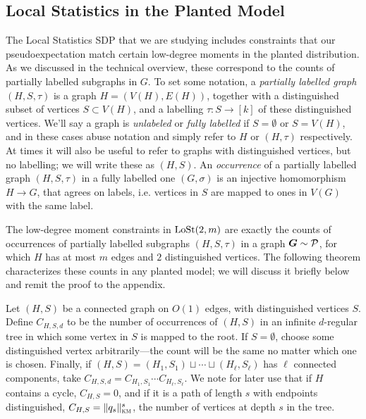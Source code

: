 \subsection{Local Statistics in the Planted Model} %
\label{sub:local_statistics_in_the_planted_model}

The Local Statistics SDP that we are studying includes constraints that our pseudoexpectation match certain low-degree moments in the planted distribution. As we discussed in the technical overview, these correspond to the counts of partially labelled subgraphs in $G$. To set some notation, a \textit{partially labelled graph} $(H,S,\tau)$ is a graph $H = (V(H),E(H))$, together with a distinguished subset of vertices $S \subset V(H)$, and a labelling $\tau : S \to [k]$ of these distinguished vertices. We'll say a graph is \emph{unlabeled} or \textit{fully labelled} if $S = \emptyset$ or $S = V(H)$, and in these cases abuse notation and simply refer to $H$ or $(H,\tau)$ respectively. At times it will also be useful to refer to graphs with distinguished vertices, but no labelling; we will write these as $(H,S)$. An \textit{occurrence} of a partially labelled graph $(H,S,\tau)$ in a fully labelled one $(G,\sigma)$ is an injective homomorphism $H \to G$, that agrees on labels, i.e. vertices in $S$ are mapped to ones in $V(G)$ with the same label.

The low-degree moment constraints in $\operatorname{LoSt}(2,m)$ are exactly the counts of occurrences of partially labelled subgraphs $(H,S,\tau)$ in a graph $\boldsymbol{G} \sim \mathcal{P}$, for which $H$ has at most $m$ edges and $2$ distinguished vertices. The following theorem characterizes these counts in any planted model; we will discuss it briefly below and remit the proof to the appendix.

\begin{definition}
    Let $(H,S)$ be a connected graph on $O(1)$ edges, with distinguished vertices $S$. Define $C_{H,S,d}$ to be the number of occurrences of $(H,S)$ in an infinite $d$-regular tree in which some vertex in $S$ is mapped to the root. If $S = \emptyset$, choose some distinguished vertex arbitrarily---the count will be the same no matter which one is chosen. Finally, if $(H,S) = (H_1,S_1) \sqcup \cdots \sqcup (H_\ell,S_\ell)$ has $\ell$ connected components, take $C_{H,S,d} = C_{H_1,S_1} \cdots C_{H_\ell,S_\ell}$. We note for later use that if $H$ contains a cycle, $C_{H,S} = 0$, and if it is a path of length $s$ with endpoints distinguished, $C_{H,S} = \|q_s\|^s_{\textsc{km}}$, the number of vertices at depth $s$ in the tree.
\end{definition}

